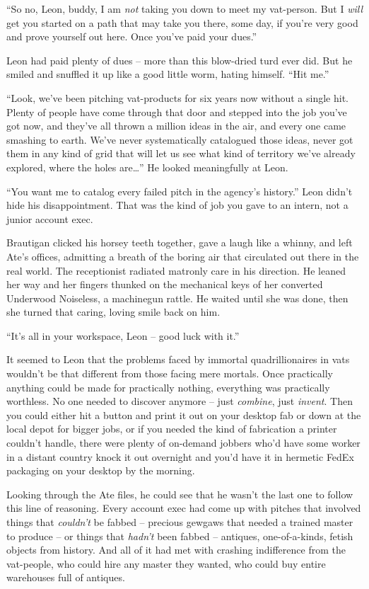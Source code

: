 “So no, Leon, buddy, I am \emph{not} taking you down to meet my 
vat-person. But I \emph{will} get you started on a path that may take 
you there, some day, if you're very good and prove yourself out here. 
Once you've paid your dues.”

Leon had paid plenty of dues -- more than this blow-dried turd ever 
did. But he smiled and snuffled it up like a good little worm, hating 
himself. “Hit me.”

“Look, we've been pitching vat-products for six years now without a 
single hit. Plenty of people have come through that door and stepped 
into the job you've got now, and they've all thrown a million ideas in 
the air, and every one came smashing to earth. We've never 
systematically catalogued those ideas, never got them in any kind of 
grid that will let us see what kind of territory we've already 
explored, where the holes are\ldots{}” He looked meaningfully at Leon.

“You want me to catalog every failed pitch in the agency's 
history.” Leon didn't hide his disappointment. That was the kind of 
job you gave to an intern, not a junior account exec.

Brautigan clicked his horsey teeth together, gave a laugh like a 
whinny, and left Ate's offices, admitting a breath of the boring air 
that circulated out there in the real world. The receptionist radiated 
matronly care in his direction. He leaned her way and her fingers 
thunked on the mechanical keys of her converted Underwood Noiseless, a 
machinegun rattle. He waited until she was done, then she turned that 
caring, loving smile back on him.

“It's all in your workspace, Leon -- good luck with it.”

\tb

It seemed to Leon that the problems faced by immortal quadrillionaires 
in vats wouldn't be that different from those facing mere mortals. Once 
practically anything could be made for practically nothing, everything 
was practically worthless. No one needed to discover anymore -- just 
\emph{combine}, just \emph{invent}. Then you could either hit a button 
and print it out on your desktop fab or down at the local depot for 
bigger jobs, or if you needed the kind of fabrication a printer 
couldn't handle, there were plenty of on-demand jobbers who'd have some 
worker in a distant country knock it out overnight and you'd have it in 
hermetic FedEx packaging on your desktop by the morning.

Looking through the Ate files, he could see that he wasn't the last one 
to follow this line of reasoning. Every account exec had come up with 
pitches that involved things that \emph{couldn't} be fabbed -- precious 
gewgaws that needed a trained master to produce -- or things that 
\emph{hadn't} been fabbed -- antiques, one-of-a-kinds, fetish objects 
from history. And all of it had met with crashing indifference from the 
vat-people, who could hire any master they wanted, who could buy entire 
warehouses full of antiques.

